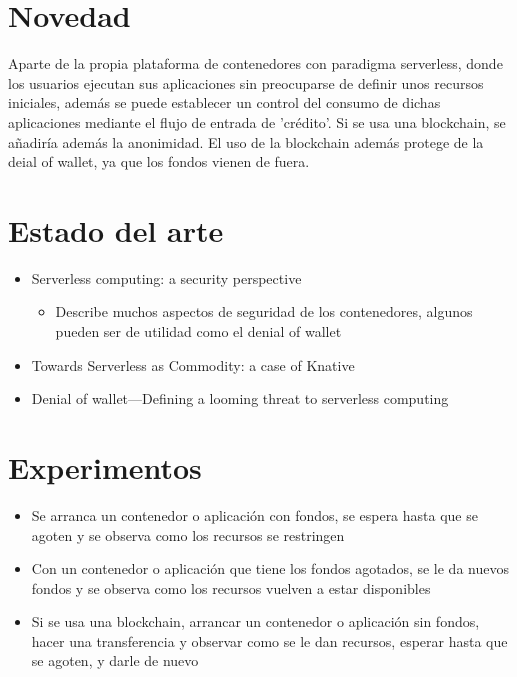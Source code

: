 \documentclass[12pt]{extarticle}
\begin{document}
    \section{Novedad}

    Aparte de la propia plataforma de contenedores con paradigma serverless, donde los usuarios ejecutan sus aplicaciones sin preocuparse de definir unos recursos iniciales, además se puede establecer un control del consumo de dichas aplicaciones mediante el flujo de entrada de 'crédito'.
    Si se usa una blockchain, se añadiría además la anonimidad. El uso de la blockchain además protege de la deial of wallet, ya que los fondos vienen de fuera.

    \section{Estado del arte}
    \begin{itemize}
    	\item Serverless computing: a security perspective
    	\begin{itemize}
    		\item Describe muchos aspectos de seguridad de los contenedores, algunos pueden ser de utilidad como el denial of wallet
    	\end{itemize}
    	\item Towards Serverless as Commodity: a case of Knative
    	\item Denial of wallet—Defining a looming threat to serverless computing
    \end{itemize}
    
    \section{Experimentos}
    \begin{itemize}
        \item Se arranca un contenedor o aplicación con fondos, se espera hasta que se agoten y se observa como los recursos se restringen
        \item Con un contenedor o aplicación que tiene los fondos agotados, se le da nuevos fondos y se observa como los recursos vuelven a estar disponibles
        \item Si se usa una blockchain, arrancar un contenedor o aplicación sin fondos, hacer una transferencia y observar como se le dan recursos, esperar hasta que se agoten, y darle de nuevo
    \end{itemize}
\end{document}
